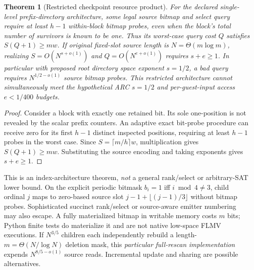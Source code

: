 \documentclass[10pt]{article}
\newtheorem{theorem}{Theorem}
\begin{document}
\begin{theorem}[Restricted checkpoint resource product]
For the declared single-level prefix-directory architecture, some legal source bitmap and select query require at least $h-1$ within-block bitmap probes, even when the block's total number of survivors is known to be one. Thus its worst-case query cost $Q$ satisfies $S(Q+1)\ge mw$.
If original fixed-slot source length is $N=\Theta(m\log m)$, realizing $S=O(N^{s+o(1)})$ and $Q=O(N^{e+o(1)})$ requires $s+e\ge1$. In particular with proposed root directory space exponent $s=1/2$, a bad query requires $N^{1/2-o(1)}$ source bitmap probes. This restricted architecture cannot simultaneously meet the hypothetical ARC $s=1/2$ and per-guest-input access $e<1/400$ budgets.
\end{theorem}
\begin{proof}
Consider a block with exactly one retained bit. Its sole one-position is not revealed by the scalar prefix counters. An adaptive exact bit-probe procedure can receive zero for its first $h-1$ distinct inspected positions, requiring at least $h-1$ probes in the worst case. Since $S=\lceil m/h\rceil w$, multiplication gives $S(Q+1)\ge mw$. Substituting the source encoding and taking exponents gives $s+e\ge1$.
\end{proof}
This is an index-architecture theorem, \emph{not} a general rank/select or arbitrary-SAT lower bound. On the explicit periodic bitmask $b_i=1$ iff $i\bmod4\ne3$, child ordinal $j$ maps to zero-based source slot $j-1+\lfloor(j-1)/3\rfloor$ without bitmap probes. Sophisticated succinct rank/select or source-aware emitter numbering may also escape. A fully materialized bitmap in writable memory costs $m$ bits; Python finite tests do materialize it and are not native low-space FLMV executions. If $N^{3/5}$ children each independently rebuild a length-$m=\Theta(N/\log N)$ deletion mask, this \emph{particular full-rescan implementation} expends $N^{8/5-o(1)}$ source reads. Incremental update and sharing are possible alternatives.
\end{document}

